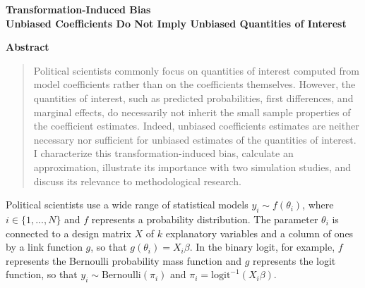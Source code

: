 \documentclass[12pt]{article}
\begin{document}
\begin{center}
{\LARGE \textbf{Transformation-Induced Bias}}\\\vspace{2mm}
{ \textbf{Unbiased Coefficients Do Not Imply Unbiased Quantities of Interest}}%

\vspace{5mm}

\end{center}

\vspace{5mm}

{\centerline{\textbf{Abstract}}}
\begin{quote}\noindent
Political scientists commonly focus on quantities of interest computed from model coefficients rather than on the coefficients themselves. 
However, the quantities of interest, such as predicted probabilities, first differences, and marginal effects, do necessarily not inherit the small sample properties of the coefficient estimates. 
Indeed, unbiased coefficients estimates are neither necessary nor sufficient for unbiased estimates of the quantities of interest. 
I characterize this transformation-induced bias, calculate an approximation, illustrate its importance with two simulation studies, and discuss its relevance to methodological research.
 \end{quote}



\thispagestyle{empty}

\doublespace


Political scientists use a wide range of statistical models $y_i \sim f(\theta_i)$, where $i \in \{1,..., N\}$ and $f$ represents a probability distribution. 
The parameter $\theta_i$ is connected to a design matrix $X$ of $k$ explanatory variables and a column of ones by a link function $g$, so that $g(\theta_i) = X_i\beta$. 
In the binary logit, for example, $f$ represents the Bernoulli probability mass function and $g$ represents the logit function, so that $y_i \sim \text{Bernoulli}(\pi_i)$ and $\pi_i = \text{logit}^{-1}(X_i\beta)$.
\end{document}
